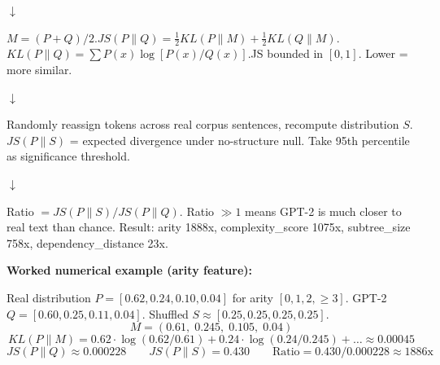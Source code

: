 \documentclass[11pt,a4paper]{article}
\begin{document}
\begin{center}\small$\downarrow$\end{center}
\begin{tcolorbox}[enhanced, title=STEP 5 --- Jensen-Shannon Divergence,
  colback=gray!5, colframe=gray!50, coltitle=black,
  fonttitle=\small\bfseries, boxrule=0.5pt, left=4pt, right=4pt, top=3pt, bottom=3pt]
\small $M = (P+Q)/2$.\quad $JS(P\|Q) = \frac{1}{2}KL(P\|M) + \frac{1}{2}KL(Q\|M)$.\quad $KL(P\|Q) = \sum P(x)\log[P(x)/Q(x)]$.\quad JS bounded in $[0,1]$. Lower = more similar.
\end{tcolorbox}
\begin{center}\small$\downarrow$\end{center}
\begin{tcolorbox}[enhanced, title=STEP 6 --- Shuffled Null Baseline,
  colback=gray!5, colframe=gray!50, coltitle=black,
  fonttitle=\small\bfseries, boxrule=0.5pt, left=4pt, right=4pt, top=3pt, bottom=3pt]
\small Randomly reassign tokens across real corpus sentences, recompute distribution $S$. $JS(P\|S)$ = expected divergence under no-structure null. Take 95th percentile as significance threshold.
\end{tcolorbox}
\begin{center}\small$\downarrow$\end{center}
\begin{tcolorbox}[enhanced, title=STEP 7 --- Ratio and Interpretation,
  colback=gray!5, colframe=gray!50, coltitle=black,
  fonttitle=\small\bfseries, boxrule=0.5pt, left=4pt, right=4pt, top=3pt, bottom=3pt]
\small Ratio $= JS(P\|S) / JS(P\|Q)$. Ratio $\gg 1$ means GPT-2 is much closer to real text than chance. Result: arity 1888x, complexity\_score 1075x, subtree\_size 758x, dependency\_distance 23x.
\end{tcolorbox}

\vspace{4pt}
\noindent\textbf{Worked numerical example (arity feature):}

Real distribution $P = [0.62, 0.24, 0.10, 0.04]$ for arity $[0, 1, 2, \geq 3]$. GPT-2 $Q = [0.60, 0.25, 0.11, 0.04]$. Shuffled $S \approx [0.25, 0.25, 0.25, 0.25]$.
\[M = (0.61,\; 0.245,\; 0.105,\; 0.04)\]
\[KL(P\|M) = 0.62\cdot\log(0.62/0.61) + 0.24\cdot\log(0.24/0.245) + \ldots \approx 0.00045\]
\[JS(P\|Q) \approx 0.000228 \qquad JS(P\|S) = 0.430 \qquad \text{Ratio} = 0.430/0.000228 \approx 1886\text{x}\]
\end{document}
